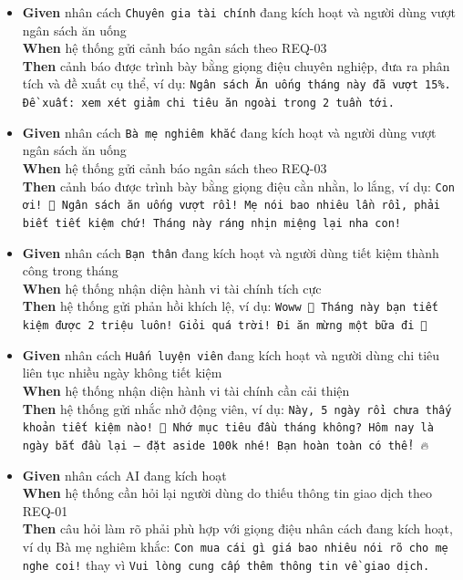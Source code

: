 \begin{itemize}
\item \textbf{Given} nhân cách \texttt{Chuyên gia tài chính} đang kích hoạt và người dùng vượt ngân sách ăn uống  \\ \hspace*{1.5em}  \textbf{When} hệ thống gửi cảnh báo ngân sách theo REQ-03  \\ \hspace*{1.5em}  \textbf{Then} cảnh báo được trình bày bằng giọng điệu chuyên nghiệp, đưa ra phân tích và đề xuất cụ thể, ví dụ: \texttt{Ngân sách Ăn uống tháng này đã vượt 15\%. Đề xuất: xem xét giảm chi tiêu ăn ngoài trong 2 tuần tới.}
\item \textbf{Given} nhân cách \texttt{Bà mẹ nghiêm khắc} đang kích hoạt và người dùng vượt ngân sách ăn uống  \\ \hspace*{1.5em}  \textbf{When} hệ thống gửi cảnh báo ngân sách theo REQ-03  \\ \hspace*{1.5em}  \textbf{Then} cảnh báo được trình bày bằng giọng điệu cằn nhằn, lo lắng, ví dụ: \texttt{Con ơi! 😤 Ngân sách ăn uống vượt rồi! Mẹ nói bao nhiêu lần rồi, phải biết tiết kiệm chứ! Tháng này ráng nhịn miệng lại nha con!}
\item \textbf{Given} nhân cách \texttt{Bạn thân} đang kích hoạt và người dùng tiết kiệm thành công trong tháng  \\ \hspace*{1.5em}  \textbf{When} hệ thống nhận diện hành vi tài chính tích cực  \\ \hspace*{1.5em}  \textbf{Then} hệ thống gửi phản hồi khích lệ, ví dụ: \texttt{Woww 🎉 Tháng này bạn tiết kiệm được 2 triệu luôn! Giỏi quá trời! Đi ăn mừng một bữa đi 🍕}
\item \textbf{Given} nhân cách \texttt{Huấn luyện viên} đang kích hoạt và người dùng chi tiêu liên tục nhiều ngày không tiết kiệm  \\ \hspace*{1.5em}  \textbf{When} hệ thống nhận diện hành vi tài chính cần cải thiện  \\ \hspace*{1.5em}  \textbf{Then} hệ thống gửi nhắc nhở động viên, ví dụ: \texttt{Này, 5 ngày rồi chưa thấy khoản tiết kiệm nào! 💪 Nhớ mục tiêu đầu tháng không? Hôm nay là ngày bắt đầu lại — đặt aside 100k nhé! Bạn hoàn toàn có thể! 🔥}
\item \textbf{Given} nhân cách AI đang kích hoạt  \\ \hspace*{1.5em}  \textbf{When} hệ thống cần hỏi lại người dùng do thiếu thông tin giao dịch theo REQ-01  \\ \hspace*{1.5em}  \textbf{Then} câu hỏi làm rõ phải phù hợp với giọng điệu nhân cách đang kích hoạt, ví dụ Bà mẹ nghiêm khắc: \texttt{Con mua cái gì giá bao nhiêu nói rõ cho mẹ nghe coi!} thay vì \texttt{Vui lòng cung cấp thêm thông tin về giao dịch.}

\end{itemize}
